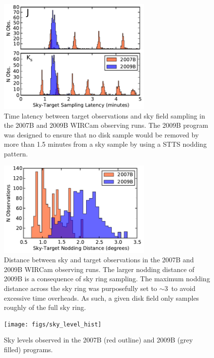 \documentclass[iop]{emulateapj}
\begin{document}
\begin{figure}[t]
    \centering
        \includegraphics[width=3in]{figs/sky_target_lag}
    \caption{Time latency between target observations and sky field sampling in the 2007B and 2009B WIRCam observing runs. The 2009B program was designed to ensure that no disk sample would be removed by more than 1.5 minutes from a sky sample by using a STTS nodding pattern.}
    \label{fig:sky_target_lag}
\end{figure}

\begin{figure}[t]
    \centering
        \includegraphics[width=3in]{figs/sky_target_dist}
    \caption{Distance between sky and target observations in the 2007B and 2009B WIRCam observing runs. The larger nodding distance of 2009B is a consequence of sky ring sampling. The maximum nodding distance across the sky ring was purposefully set to $\sim 3$\arcdeg\ to avoid excessive time overheads. As such, a given disk field only samples roughly of the full sky ring.}
    \label{fig:sky_target_dist}
\end{figure}

\begin{figure}[t]
    \centering
        \texttt{[image: figs/sky\_level\_hist]}
    \caption{Sky levels observed in the 2007B (red outline) and 2009B (grey filled) programs.}
    \label{fig:net_sky_level}
\end{figure}
\end{document}

